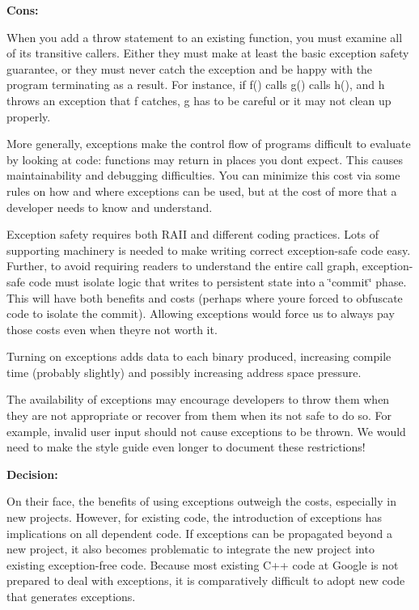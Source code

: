 {\bfseries Cons\+:}


\begin{DoxyItemize}
\item When you add a throw statement to an existing function, you must examine all of its transitive callers. Either they must make at least the basic exception safety guarantee, or they must never catch the exception and be happy with the program terminating as a result. For instance, if f() calls g() calls h(), and h throws an exception that f catches, g has to be careful or it may not clean up properly.
\item More generally, exceptions make the control flow of programs difficult to evaluate by looking at code\+: functions may return in places you don\textquotesingle{}t expect. This causes maintainability and debugging difficulties. You can minimize this cost via some rules on how and where exceptions can be used, but at the cost of more that a developer needs to know and understand.
\item Exception safety requires both R\+A\+II and different coding practices. Lots of supporting machinery is needed to make writing correct exception-\/safe code easy. Further, to avoid requiring readers to understand the entire call graph, exception-\/safe code must isolate logic that writes to persistent state into a \char`\"{}commit\char`\"{} phase. This will have both benefits and costs (perhaps where you\textquotesingle{}re forced to obfuscate code to isolate the commit). Allowing exceptions would force us to always pay those costs even when they\textquotesingle{}re not worth it.
\item Turning on exceptions adds data to each binary produced, increasing compile time (probably slightly) and possibly increasing address space pressure.
\item The availability of exceptions may encourage developers to throw them when they are not appropriate or recover from them when it\textquotesingle{}s not safe to do so. For example, invalid user input should not cause exceptions to be thrown. We would need to make the style guide even longer to document these restrictions!
\end{DoxyItemize}

{\bfseries Decision\+:}

On their face, the benefits of using exceptions outweigh the costs, especially in new projects. However, for existing code, the introduction of exceptions has implications on all dependent code. If exceptions can be propagated beyond a new project, it also becomes problematic to integrate the new project into existing exception-\/free code. Because most existing C++ code at Google is not prepared to deal with exceptions, it is comparatively difficult to adopt new code that generates exceptions.


